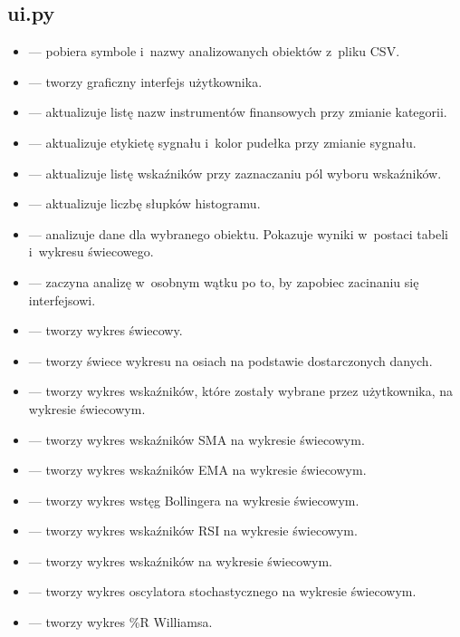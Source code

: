 \documentclass[12pt]{article}
\begin{document}
    \subsection{ui.py}\label{subsec:ui.py}
	\begin{itemize}
        \item {} — pobiera symbole i~nazwy analizowanych obiektów z~pliku CSV\@.
        \item {} — tworzy graficzny interfejs użytkownika.
        \item {} — aktualizuje listę nazw instrumentów finansowych przy zmianie kategorii.
        \item {} — aktualizuje etykietę sygnału i~kolor pudełka przy zmianie sygnału.
        \item {} — aktualizuje listę wskaźników przy zaznaczaniu pól wyboru wskaźników.
        \item {} — aktualizuje liczbę słupków histogramu.
        \item {} — analizuje dane dla wybranego obiektu.
        Pokazuje wyniki w~postaci tabeli i~wykresu świecowego.
        \item {} — zaczyna analizę w~osobnym wątku po to, by zapobiec zacinaniu się interfejsowi.
        \item {} — tworzy wykres świecowy.
        \item {} — tworzy świece wykresu na osiach na podstawie dostarczonych danych.
        \item {} — tworzy wykres wskaźników, które zostały wybrane przez użytkownika,
		na wykresie świecowym.
        \item {} — tworzy wykres wskaźników SMA na wykresie świecowym.
        \item {} — tworzy wykres wskaźników EMA na wykresie świecowym.
        \item {} — tworzy wykres wstęg Bollingera na wykresie świecowym.
        \item {} — tworzy wykres wskaźników RSI na wykresie świecowym.
        \item {} — tworzy wykres wskaźników na wykresie świecowym.
        \item {} — tworzy wykres oscylatora stochastycznego na wykresie świecowym.
        \item {} — tworzy wykres \%R Williamsa.
    \end{itemize}
\end{document}
